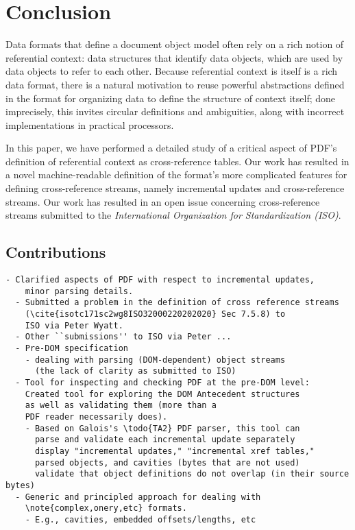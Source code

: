 \section{Conclusion }
\label{sec:conclusion}
%
Data formats that define a document object model often rely on a rich
notion of referential context: data structures that identify data
objects, which are used by data objects to refer to each other.
%
Because referential context is itself is a rich data format, there is
a natural motivation to reuse powerful abstractions defined in the
format for organizing data to define the structure of context itself;
%
done imprecisely, this invites circular definitions and ambiguities,
along with incorrect implementations in practical processors.

%
In this paper, we have performed a detailed study of a critical aspect
of PDF's definition of referential context as cross-reference tables.
%
Our work has resulted in a novel machine-readable definition of the
format's more complicated features for defining cross-reference
streams, namely incremental updates and cross-reference streams.
%
Our work has resulted in an open issue concerning cross-reference
streams submitted to the \emph{International Organization for
  Standardization (ISO)}.

\subsection{Contributions}

\begin{lstlisting}[style=meta]
  - Clarified aspects of PDF with respect to incremental updates,
    minor parsing details.
  - Submitted a problem in the definition of cross reference streams
    (\cite{isotc171sc2wg8ISO32000220202020} Sec 7.5.8) to
    ISO via Peter Wyatt.
  - Other ``submissions'' to ISO via Peter ...
  - Pre-DOM specification
    - dealing with parsing (DOM-dependent) object streams
      (the lack of clarity as submitted to ISO)
  - Tool for inspecting and checking PDF at the pre-DOM level:
    Created tool for exploring the DOM Antecedent structures
    as well as validating them (more than a
    PDF reader necessarily does).
    - Based on Galois's \todo{TA2} PDF parser, this tool can
      parse and validate each incremental update separately
      display "incremental updates," "incremental xref tables,"
      parsed objects, and cavities (bytes that are not used)
      validate that object definitions do not overlap (in their source bytes)
  - Generic and principled approach for dealing with
    \note{complex,onery,etc} formats.
    - E.g., cavities, embedded offsets/lengths, etc
\end{lstlisting}

